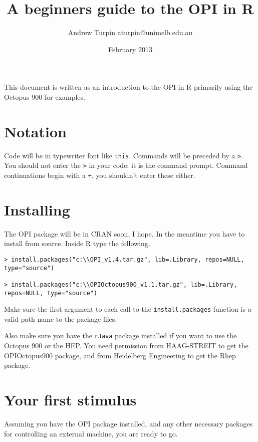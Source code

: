 \documentclass{article}
\title{A beginners guide to the OPI in R}
\date{February 2013}
\author{Andrew Turpin aturpin@unimelb.edu.au}
\begin{document}
\maketitle

This document is written as an introduction to the OPI in R primarily
using the Octopus 900 for examples.

\section{Notation}

Code will be in typewriter font like {\tt this}.
Commands will be preceded by a {\tt >}. You should not enter the {\tt >} in your code: it is
the command prompt. Command continuations begin with a {\tt +}, you shouldn't enter these
either.

\section{Installing}
\label{sec-install}

The OPI package will be in CRAN soon, I hope. In the meantime you have to install from source.
Inside R type the following.

\begin{verbatim}
> install.packages("c:\\OPI_v1.4.tar.gz", lib=.Library, repos=NULL, type="source")

> install.packages("c:\\OPIOctopus900_v1.1.tar.gz", lib=.Library, repos=NULL, type="source")
\end{verbatim}

Make sure the first argument to each call to the {\tt install.packages}
function is a valid path name to the package files.

Also make sure you have the {\tt rJava} package installed if you
want to use the Octopus 900 or the HEP. You need permission from
HAAG-STREIT to get the OPIOctopus900 package, and from Heidelberg
Engineering to get the Rhep package.




\section{Your first stimulus}

Assuming you have the OPI package installed, and any other necessary
packages for controlling an external machine, you are ready to go.
\end{document}

